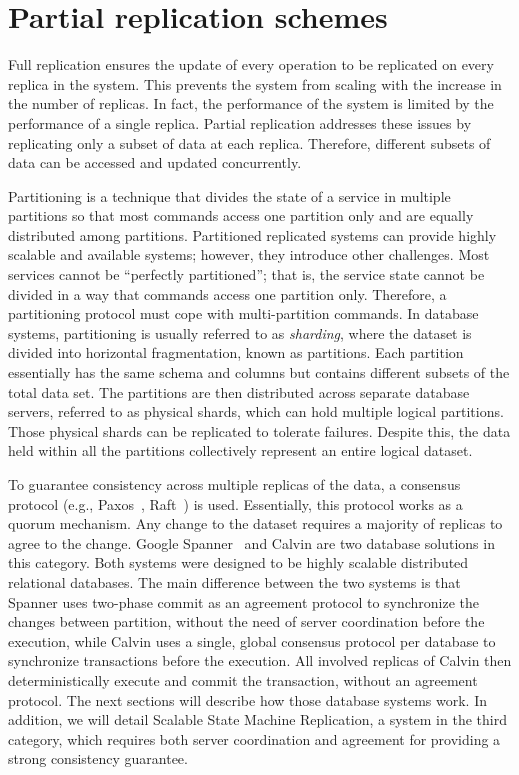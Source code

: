 \section{Partial replication schemes}

Full replication ensures the update of every operation to be replicated on
every replica in the system. This prevents the system from scaling with the
increase in the number of replicas. In fact, the performance of the system is
limited by the performance of a single replica. Partial replication addresses
these issues by replicating only a subset of data at each replica. Therefore,
different subsets of data can be accessed and updated concurrently. 

Partitioning is a technique that divides the state of a service in multiple
partitions so that most commands access one partition only and are equally
distributed among partitions. Partitioned replicated systems can provide highly
scalable and available systems; however, they introduce other challenges. Most
services cannot be ``perfectly partitioned''; that is, the service state cannot
be divided in a way that commands access one partition only. Therefore, a
partitioning protocol must cope with multi-partition commands. In database
systems, partitioning is usually referred to as \emph{sharding}, where the dataset
is divided into horizontal fragmentation, known as partitions. Each partition
essentially has the same schema and columns but contains different subsets of
the total data set. The partitions are then distributed across separate database
servers, referred to as physical shards, which can hold multiple logical
partitions. Those physical shards can be replicated to tolerate failures. 
Despite this, the data held within all the partitions collectively
represent an entire logical dataset. 

To guarantee consistency across multiple replicas of the data, a consensus
protocol (e.g., Paxos~\cite{Lam98}, Raft~\cite{184040}) is used. 
Essentially, this protocol works as a quorum
mechanism. Any change to the dataset requires a majority of replicas to agree to
the change. Google Spanner~\cite{corbett2013spanner} and Calvin \cite{calvin}
are two database solutions in this category. Both systems were designed
to be highly scalable distributed relational databases. The main difference
between the two systems is that Spanner uses two-phase commit as an agreement
protocol to synchronize the changes between partition, without the need of
server coordination before the execution, while Calvin uses a single, global
consensus protocol per database to synchronize transactions before the execution.
All involved replicas of Calvin then deterministically execute and commit the
transaction, without an agreement protocol. The next sections will describe how
those database systems work. In addition, we will detail Scalable State
Machine Replication, a system in the third category, which requires both server
coordination and agreement for providing a strong consistency guarantee.



